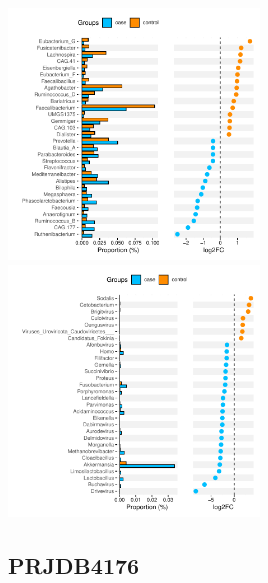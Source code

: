 \documentclass[
]{article}
\begin{document}
\includegraphics[width=0.5\textwidth,height=0.5\textheight]{../../Analysis_shotgun_ERP012177/04_Wilcoxon/atlas/output/class_ERP012177_pvalue0.05case_control_metagenomics.pdf}
\includegraphics[width=0.5\textwidth,height=0.5\textheight]{../../Analysis_shotgun_ERP012177/04_Wilcoxon/Kraken2/output/class_ERP012177_pvalue0.05case_control_metagenomics.pdf}

\hypertarget{prjdb4176-1}{%
\subsection{PRJDB4176}\label{prjdb4176-1}}
\end{document}
